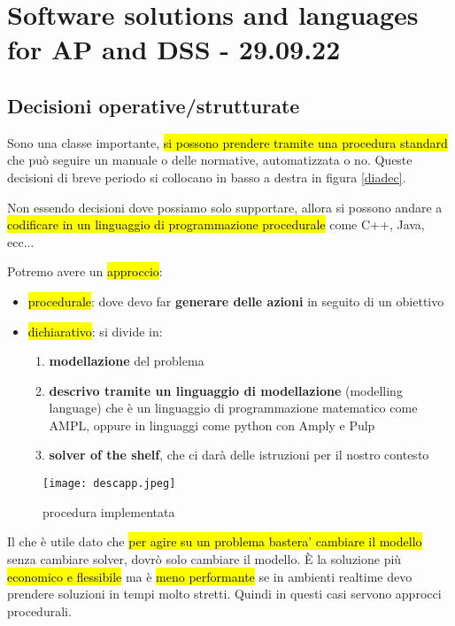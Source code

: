 \newpage
\section{Software solutions and languages for AP and DSS - 29.09.22}


\subsection{Decisioni operative/strutturate}

Sono una classe importante, \hl{si possono prendere tramite una procedura standard} che può seguire un manuale o delle normative, automatizzata o no. Queste decisioni di breve periodo si collocano in basso a destra in figura  \ref{diadec}.

Non essendo decisioni dove possiamo solo supportare, allora si possono andare a \hl{codificare in un linguaggio di programmazione procedurale} come C++, Java, ecc...

Potremo avere un \hl{approccio}:

\begin{itemize}
	\item \hl{procedurale}: dove devo far \textbf{generare delle azioni} in seguito di un obiettivo
	
	\item \hl{dichiarativo}: si divide in:
		\begin{enumerate}
			\item \textbf{modellazione} del problema
			
			\item \textbf{descrivo tramite un linguaggio di modellazione} (modelling language) che è un linguaggio di programmazione matematico come AMPL, oppure in linguaggi come python con Amply e Pulp
			
			\item \textbf{solver of the shelf}, che ci darà delle istruzioni per il nostro contesto
		\end{enumerate}
\end{itemize}


\begin{figure}[H]
\centering
\texttt{[image: descapp.jpeg]}
\caption{procedura implementata} 
\label{descapp}
\end{figure}


Il che è utile dato che \hl{per agire su un problema bastera' cambiare il modello} senza cambiare solver, dovrò solo cambiare il modello. È la soluzione più \hl{economico e flessibile} ma è \hl{meno performante} se in ambienti realtime devo prendere soluzioni in tempi molto stretti. Quindi in questi casi servono approcci procedurali.

